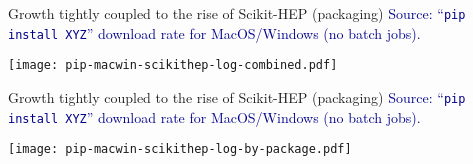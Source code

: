 \begin{frame}{Growth tightly coupled to the rise of Scikit-HEP (packaging)}
\vspace{0.25 cm}
\textcolor{darkblue}{Source: ``\texttt{pip install XYZ}'' download rate for MacOS/Windows (no batch jobs).}

\vspace{0.1 cm}
\texttt{[image: pip-macwin-scikithep-log-combined.pdf]}
\end{frame}

\begin{frame}{Growth tightly coupled to the rise of Scikit-HEP (packaging)}
\vspace{0.25 cm}
\textcolor{darkblue}{Source: ``\texttt{pip install XYZ}'' download rate for MacOS/Windows (no batch jobs).}

\vspace{0.1 cm}
\texttt{[image: pip-macwin-scikithep-log-by-package.pdf]}
\end{frame}
